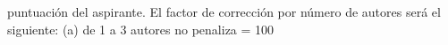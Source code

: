 \documentclass{article}
\begin{document}
\begin{itemize}
puntuación del aspirante. El factor de corrección por número de autores será el siguiente: (a) de 1 a 3 autores no penaliza = 100 %
\end{itemize}
\end{document}
